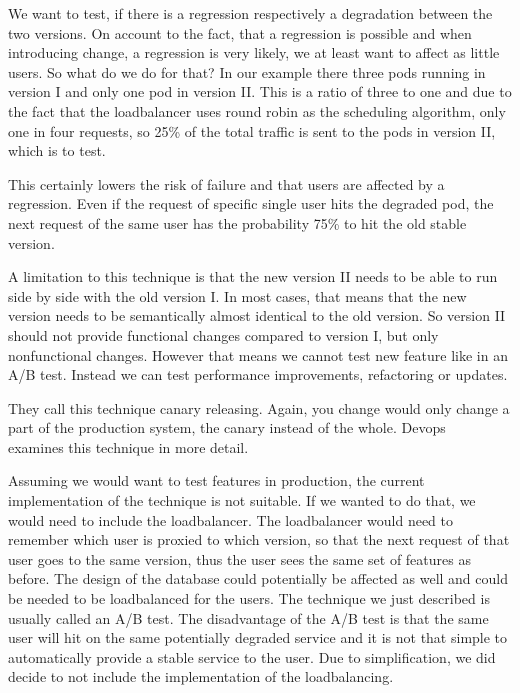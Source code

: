 We want to test, if there is a regression respectively a degradation between the two
versions. On account to the fact, that a regression is possible and when introducing
change, a regression is very likely, we at least want to affect as little users. So what
do we do for that? In our example there three pods running in version I and only one pod
in version II. This is a ratio of three to one and due to the fact that the loadbalancer
uses round robin as the scheduling algorithm, only one in four requests, so 25\% of the
total traffic is sent to the pods in version II, which is to test.

This certainly lowers the risk of failure and that users are affected by a
regression. Even if the request of specific single user hits the degraded pod, the next
request of the same user has the probability 75\% to hit the old stable version.

A limitation to this technique is that the new version II needs to be able to run side by
side with the old version I. In most cases, that means that the new version needs to be
semantically almost identical to the old version. So version II should not provide
functional changes compared to version I, but only nonfunctional changes. However that
means we cannot test new feature like in an A/B test. Instead we can test performance
improvements, refactoring or updates.

They call this technique canary releasing. Again, you change would only change a part of
the production system, the canary instead of the whole. Devops~\cite{cd_humble_deploy}
examines this technique in more detail.

Assuming we would want to test features in production, the current implementation of the
technique is not suitable. If we wanted to do that, we would need to include the
loadbalancer. The loadbalancer would need to remember which user is proxied to which
version, so that the next request of that user goes to the same version, thus the user
sees the same set of features as before. The design of the database could potentially be
affected as well and could be needed to be loadbalanced for the users. The technique we
just described is usually called an A/B test. The disadvantage of the A/B test is that the
same user will hit on the same potentially degraded service and it is not that simple to
automatically provide a stable service to the user. Due to simplification, we did decide
to not include the implementation of the loadbalancing.

